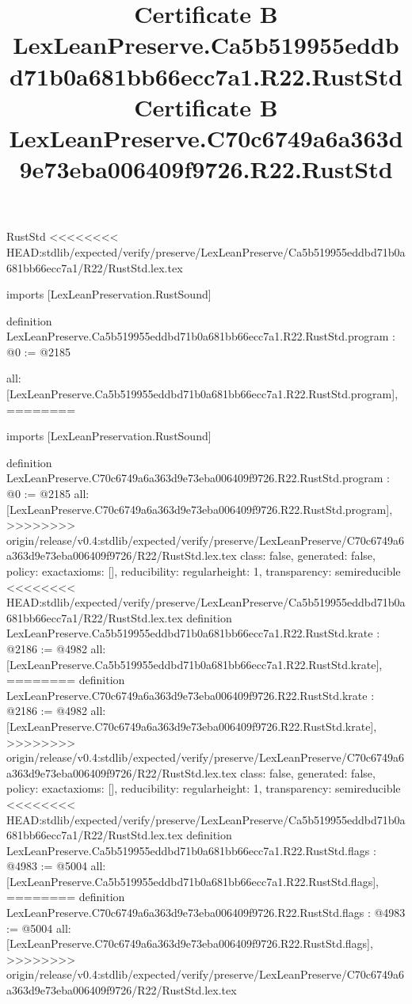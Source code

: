 \begin{lexlean}{RustStd}
<<<<<<<< HEAD:stdlib/expected/verify/preserve/LexLeanPreserve/Ca5b519955eddbd71b0a681bb66ecc7a1/R22/RustStd.lex.tex
\title{Certificate B LexLeanPreserve.Ca5b519955eddbd71b0a681bb66ecc7a1.R22.RustStd}
\begin{coremodule}
imports [LexLeanPreservation.RustSound]

definition LexLeanPreserve.Ca5b519955eddbd71b0a681bb66ecc7a1.R22.RustStd.program : @0 := @2185 {
  all: [LexLeanPreserve.Ca5b519955eddbd71b0a681bb66ecc7a1.R22.RustStd.program],
========
\title{Certificate B LexLeanPreserve.C70c6749a6a363d9e73eba006409f9726.R22.RustStd}
\begin{coremodule}
imports [LexLeanPreservation.RustSound]

definition LexLeanPreserve.C70c6749a6a363d9e73eba006409f9726.R22.RustStd.program : @0 := @2185 {
  all: [LexLeanPreserve.C70c6749a6a363d9e73eba006409f9726.R22.RustStd.program],
>>>>>>>> origin/release/v0.4:stdlib/expected/verify/preserve/LexLeanPreserve/C70c6749a6a363d9e73eba006409f9726/R22/RustStd.lex.tex
  class: false,
  generated: false,
  policy: exact{axioms: []},
  reducibility: regular{height: 1},
  transparency: semireducible
}
<<<<<<<< HEAD:stdlib/expected/verify/preserve/LexLeanPreserve/Ca5b519955eddbd71b0a681bb66ecc7a1/R22/RustStd.lex.tex
definition LexLeanPreserve.Ca5b519955eddbd71b0a681bb66ecc7a1.R22.RustStd.krate : @2186 := @4982 {
  all: [LexLeanPreserve.Ca5b519955eddbd71b0a681bb66ecc7a1.R22.RustStd.krate],
========
definition LexLeanPreserve.C70c6749a6a363d9e73eba006409f9726.R22.RustStd.krate : @2186 := @4982 {
  all: [LexLeanPreserve.C70c6749a6a363d9e73eba006409f9726.R22.RustStd.krate],
>>>>>>>> origin/release/v0.4:stdlib/expected/verify/preserve/LexLeanPreserve/C70c6749a6a363d9e73eba006409f9726/R22/RustStd.lex.tex
  class: false,
  generated: false,
  policy: exact{axioms: []},
  reducibility: regular{height: 1},
  transparency: semireducible
}
<<<<<<<< HEAD:stdlib/expected/verify/preserve/LexLeanPreserve/Ca5b519955eddbd71b0a681bb66ecc7a1/R22/RustStd.lex.tex
definition LexLeanPreserve.Ca5b519955eddbd71b0a681bb66ecc7a1.R22.RustStd.flags : @4983 := @5004 {
  all: [LexLeanPreserve.Ca5b519955eddbd71b0a681bb66ecc7a1.R22.RustStd.flags],
========
definition LexLeanPreserve.C70c6749a6a363d9e73eba006409f9726.R22.RustStd.flags : @4983 := @5004 {
  all: [LexLeanPreserve.C70c6749a6a363d9e73eba006409f9726.R22.RustStd.flags],
>>>>>>>> origin/release/v0.4:stdlib/expected/verify/preserve/LexLeanPreserve/C70c6749a6a363d9e73eba006409f9726/R22/RustStd.lex.tex
}}}
\end{coremodule}}
\end{coremodule}
\end{lexlean}
